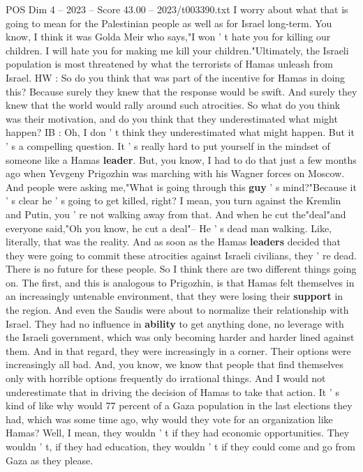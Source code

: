 \begin{textsample}{POS Dim 4 – 2023 – Score 43.00 – 2023/t003390.txt}
I worry about what that is going to mean for the Palestinian people as well as for Israel long-term.
You know, I think it was Golda Meir who says,"I won ' t hate you for killing our children.
I will hate you for making me kill your children."Ultimately, the Israeli population is most threatened by what the terrorists of Hamas unleash from Israel.
HW : So do you think that was part of the incentive for Hamas in doing this?
Because surely they knew that the response would be swift.
And surely they knew that the world would rally around such atrocities.
So what do you think was their motivation, and do you think that they underestimated what might happen?
IB : Oh, I don ' t think they underestimated what might happen.
But it ' s a compelling question.
It ' s really hard to put yourself in the mindset of someone like a Hamas \textbf{leader}.
But, you know, I had to do that just a few months ago when Yevgeny Prigozhin was marching with his Wagner forces on Moscow.
And people were asking me,"What is going through this \textbf{guy} ' s mind?"Because it ' s clear he ' s going to get killed, right?
I mean, you turn against the Kremlin and Putin, you ' re not walking away from that.
And when he cut the"deal"and everyone said,"Oh you know, he cut a deal"-- He ' s dead man walking.
Like, literally, that was the reality.
And as soon as the Hamas \textbf{leaders} decided that they were going to commit these atrocities against Israeli civilians, they ' re dead.
There is no future for these people.
So I think there are two different things going on.
The first, and this is analogous to Prigozhin, is that Hamas felt themselves in an increasingly untenable environment, that they were losing their \textbf{support} in the region.
And even the Saudis were about to normalize their relationship with Israel.
They had no influence in \textbf{ability} to get anything done, no leverage with the Israeli government, which was only becoming harder and harder lined against them.
And in that regard, they were increasingly in a corner.
Their options were increasingly all bad.
And, you know, we know that people that find themselves only with horrible options frequently do irrational things.
And I would not underestimate that in driving the decision of Hamas to take that action.
It ' s kind of like why would 77 percent of a Gaza population in the last elections they had, which was some time ago, why would they vote for an organization like Hamas?
Well, I mean, they wouldn ' t if they had economic opportunities.
They wouldn ' t, if they had education, they wouldn ' t if they could come and go from Gaza as they please.

\end{textsample}
